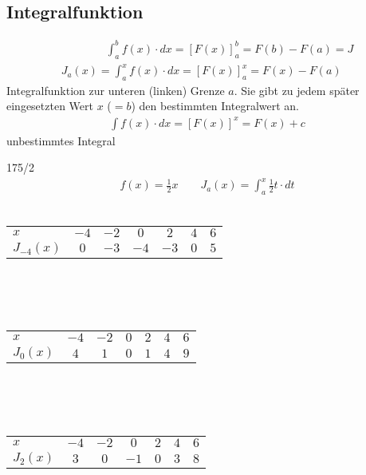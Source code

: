 \subsection{Integralfunktion}
\begin{gather*}
  \qquad\qquad \int_a^b f(x) \cdot dx = \left[F(x)\right]_a^b = F(b) - F(a) = J \\
  J_a(x) = \int_a^x f(x) \cdot dx = \left[F(x)\right]_a^x = F(x) - F(a)
\end{gather*}
Integralfunktion zur unteren (linken) Grenze $a$. Sie gibt zu jedem später eingesetzten Wert $x$ ($= b$) den bestimmten Integralwert an.
\begin{gather*}
  \int f(x) \cdot dx = \left[F(x)\right]^x = F(x) + c
\end{gather*}
unbestimmtes Integral
\begin{exercise}{175/2}
  \begin{gather*}
    f(x) = \frac{1}{2}x \qquad J_a(x) = \int_a^x \frac{1}{2}t \cdot dt
  \end{gather*} \\
  \begin{tabular}{l|cccccc}
    $x$ & $-4$ & $-2$ & $0$ & $2$ & $4$ & $6$ \\
    $J_{-4}(x)$ & $0$ & $-3$ & $-4$ & $-3$ & $0$ & $5$
  \end{tabular} \\\\\\
  \begin{tabular}{l|cccccc}
    $x$ & $-4$ & $-2$ & $0$ & $2$ & $4$ & $6$ \\
    $J_0(x)$ & $4$ & $1$ & $0$ & $1$ & $4$ & $9$
  \end{tabular} \\\\\\
  \begin{tabular}{l|cccccc}
    $x$ & $-4$ & $-2$ & $0$ & $2$ & $4$ & $6$ \\
    $J_2(x)$ & $3$ & $0$ & $-1$ & $0$ & $3$ & $8$
  \end{tabular}
\end{exercise}
